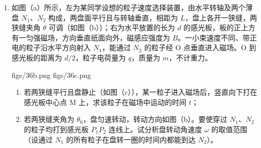 \documentclass[\gkver]{gaokaozhenti}
\begin{document}
\begin{enumerate}
\item
如图（a）所示，左为某同学设想的粒子速度选择装置，由水平转轴及两个薄盘 $N_{1}$、$N_{2}$ 构成，两盘面平行且与转轴垂直，相距为 $L$，盘上各开一狭缝，两狭缝夹角 $\theta$ 可调（如图（b））；右为水平放置的长为 $d$ 的感光板，板的正上方有一匀强磁场，方向垂直纸面向外，磁感应强度为 $B$。一小束速度不同、带正电的粒子沿水平方向射入 $N_{1}$，能通过 $N_{2}$ 的粒子经 O 点垂直进入磁场。O 到感光板的距离为 $d/2$，粒子电荷量为 $q$，质量为 $m$，不计重力。

{figs/36b.png}
{figs/36c.png}

\begin{enumerate}
	\item
	若两狭缝平行且盘静止（如图（c）），某一粒子进入磁场后，竖直向下打在感光板中心点 M 上，求该粒子在磁场中运动的时间 $t$；

	\item
	若两狭缝夹角为 $\theta_{0}$，盘匀速转动，转动方向如图（b）。要使穿过 $N_{1}$、$N_{2}$ 的粒子均打到感光板 $P_{1}P_{2}$ 连线上。试分析盘转动角速度 $\omega$ 的取值范围（设通过 $N_{1}$ 的所有粒子在盘转一圈的时间内都能到达 $N_{2}$）。
\end{enumerate}


\end{enumerate}
\end{document}
